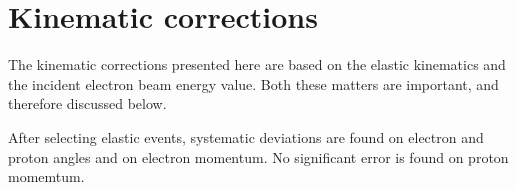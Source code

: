 \cia\vspace{-2cm}
\section{Kinematic corrections}
The kinematic corrections presented here are based on the elastic kinematics
and the incident electron beam energy value. Both  these matters are important,
and therefore discussed below.

After selecting elastic events, systematic deviations are found on electron and proton angles 
and on electron momentum. No significant error is found on proton momemtum.





